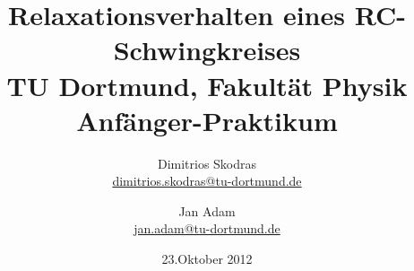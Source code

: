 



\title{Relaxationsverhalten eines RC-Schwingkreises\\				%
\large TU Dortmund, Fakultät Physik\\ 
\normalsize Anfänger-Praktikum}

\author{Dimitrios Skodras\\			%
{\small \href{dimitrios.skodras@tu-dortmund.de}{dimitrios.skodras@tu-dortmund.de}}	%
\and						%
Jan Adam\\					%
{\small \href{jan.adam@tu-dortmund.de}{jan.adam@tu-dortmund.de}}		%
}
\date{23.Oktober 2012}				%





\maketitle					%

\thispagestyle{empty} 				%


\tableofcontents


\newpage					%



